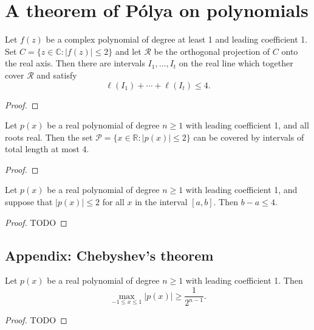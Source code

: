\chapter{A theorem of Pólya on polynomials}

\begin{theorem}
  \label{ch23theorem1}
  Let $f(z)$ be a complex polynomial of degree at least 1 and leading coefficient 1. Set $C = \{ z \in \mathbb{C} : |f(z)| \leq 2 \}$ and let $\mathcal{R}$ be the orthogonal projection of $C$ onto the real axis. Then there are intervals $I_1, \dots, I_t$ on the real line which together cover $\mathcal{R}$ and satisfy
  \[
  \ell(I_1) + \cdots + \ell(I_t) \leq 4.
  \]
\end{theorem}
\begin{proof}
\end{proof}

\begin{theorem}
  \label{ch23theorem2}
  Let $p(x)$ be a real polynomial of degree $n \geq 1$ with leading coefficient 1, and all roots real.
  Then the set $\mathcal{P} = \{x \in \mathbb{R} : |p(x)| \leq 2\}$ can be covered by intervals of
  total length at most 4.
\end{theorem}
\begin{proof}
\end{proof}

\begin{corollary}
  \label{ch23corollary}
  Let $p(x)$ be a real polynomial of degree $n \geq 1$ with leading coefficient 1, and suppose that $|p(x)| \leq 2$ for all $x$ in the interval $[a, b]$. Then $b - a \leq 4$.
\end{corollary}
\begin{proof}
  TODO
\end{proof}


\section{Appendix: Chebyshev's theorem}
\begin{theorem}
  \label{chebyshev}
  Let $p(x)$ be a real polynomial of degree $n \geq 1$ with leading coefficient 1. Then
\[
\max_{-1 \leq x \leq 1} |p(x)| \geq \frac{1}{2^{n-1}}.
\]
\end{theorem}
\begin{proof}
  TODO
\end{proof}

